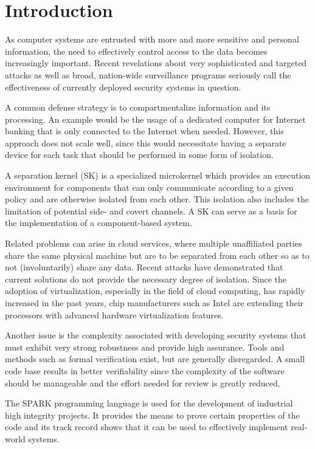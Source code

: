 \chapter{Introduction}
As computer systems are entrusted with more and more sensitive and personal
information, the need to effectively control access to the data becomes
increasingly important. Recent revelations about very sophisticated and
targeted attacks as well as broad, nation-wide surveillance programs seriously
call the effectiveness of currently deployed security systems in question.

A common defense strategy is to compartmentalize information and its processing.
An example would be the usage of a dedicated computer for Internet banking that
is only connected to the Internet when needed. However, this approach does not
scale well, since this would necessitate having a separate device for each task
that should be performed in some form of isolation.

A separation kernel (SK) is a specialized microkernel which provides an
execution environment for components that can only communicate according to a
given policy and are otherwise isolated from each other. This isolation also
includes the limitation of potential side- and covert channels. A SK can serve
as a basis for the implementation of a component-based system.

Related problems can arise in cloud services, where multiple unaffiliated parties
share the same physical machine but are to be separated from each other so as to
not (involuntarily) share any data. Recent attacks
\cite{Wu:2012:WHH:2362793.2362802} have demonstrated that current solutions do
not provide the necessary degree of isolation. Since the adoption of
virtualization, especially in the field of cloud computing, has rapidly
increased in the past years, chip manufacturers such as Intel are extending
their processors with advanced hardware virtualization features.

Another issue is the complexity associated with developing security systems
that must exhibit very strong robustness and provide high assurance. Tools and
methods such as formal verification exist, but are generally disregarded. A
small code base results in better verifiability since the complexity of the
software should be manageable and the effort needed for review is greatly
reduced.

The SPARK programming language is used for the development of industrial high
integrity projects. It provides the means to prove certain properties of the
code and its track record \cite{Chapman:2000:IES:369264.369270} shows that it
can be used to effectively implement real-world systems.

